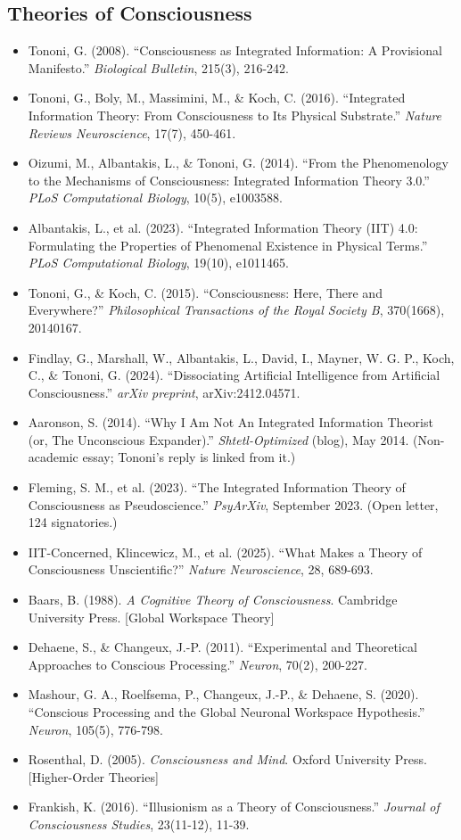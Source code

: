 \documentclass[11pt,letterpaper]{article}
\begin{document}
\subsection*{Theories of Consciousness}
\begin{itemize}[leftmargin=1.5em]
  \item Tononi, G. (2008). ``Consciousness as Integrated Information: A Provisional Manifesto.'' \textit{Biological Bulletin}, 215(3), 216-242.
  \item Tononi, G., Boly, M., Massimini, M., \& Koch, C. (2016). ``Integrated Information Theory: From Consciousness to Its Physical Substrate.'' \textit{Nature Reviews Neuroscience}, 17(7), 450-461.
  \item Oizumi, M., Albantakis, L., \& Tononi, G. (2014). ``From the Phenomenology to the Mechanisms of Consciousness: Integrated Information Theory 3.0.'' \textit{PLoS Computational Biology}, 10(5), e1003588.
  \item Albantakis, L., et al. (2023). ``Integrated Information Theory (IIT) 4.0: Formulating the Properties of Phenomenal Existence in Physical Terms.'' \textit{PLoS Computational Biology}, 19(10), e1011465.
  \item Tononi, G., \& Koch, C. (2015). ``Consciousness: Here, There and Everywhere?'' \textit{Philosophical Transactions of the Royal Society B}, 370(1668), 20140167.
  \item Findlay, G., Marshall, W., Albantakis, L., David, I., Mayner, W. G. P., Koch, C., \& Tononi, G. (2024). ``Dissociating Artificial Intelligence from Artificial Consciousness.'' \textit{arXiv preprint}, arXiv:2412.04571.
  \item Aaronson, S. (2014). ``Why I Am Not An Integrated Information Theorist (or, The Unconscious Expander).'' \textit{Shtetl-Optimized} (blog), May 2014. (Non-academic essay; Tononi's reply is linked from it.)
  \item Fleming, S. M., et al. (2023). ``The Integrated Information Theory of Consciousness as Pseudoscience.'' \textit{PsyArXiv}, September 2023. (Open letter, 124 signatories.)
  \item IIT-Concerned, Klincewicz, M., et al. (2025). ``What Makes a Theory of Consciousness Unscientific?'' \textit{Nature Neuroscience}, 28, 689-693.
  \item Baars, B. (1988). \textit{A Cognitive Theory of Consciousness}. Cambridge University Press. [Global Workspace Theory]
  \item Dehaene, S., \& Changeux, J.-P. (2011). ``Experimental and Theoretical Approaches to Conscious Processing.'' \textit{Neuron}, 70(2), 200-227.
  \item Mashour, G. A., Roelfsema, P., Changeux, J.-P., \& Dehaene, S. (2020). ``Conscious Processing and the Global Neuronal Workspace Hypothesis.'' \textit{Neuron}, 105(5), 776-798.
  \item Rosenthal, D. (2005). \textit{Consciousness and Mind}. Oxford University Press. [Higher-Order Theories]
  \item Frankish, K. (2016). ``Illusionism as a Theory of Consciousness.'' \textit{Journal of Consciousness Studies}, 23(11-12), 11-39.
\end{itemize}
\end{document}

